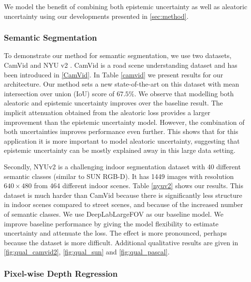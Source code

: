 We model the benefit of combining both epistemic uncertainty as well as aleatoric uncertainty using our developments presented in \cref{sec:method}. 

\subsubsection{Semantic Segmentation}

To demonstrate our method for semantic segmentation, we use two datasets, CamVid \citep{brostow2009semantic} and NYU v2 \citep{silberman2012indoor}. CamVid is a road scene understanding dataset and has been introduced in \cref{CamVid}. In Table \ref{camvid} we present results for our architecture. Our method sets a new state-of-the-art on this dataset with mean intersection over union (IoU) score of $67.5\%$. We observe that modelling both aleatoric and epistemic uncertainty improves over the baseline result.  The implicit attenuation obtained from the aleatoric loss provides a larger improvement than the epistemic uncertainty model. However, the combination of both uncertainties improves performance even further. This shows that for this application it is more important to model aleatoric uncertainty, suggesting that epistemic uncertainty can be mostly explained away in this large data setting.

Secondly, NYUv2 \citep{silberman2012indoor} is a challenging indoor segmentation dataset with 40 different semantic classes (similar to SUN RGB-D). It has 1449 images with resolution $640\times480$ from 464 different indoor scenes. Table \ref{nyuv2} shows our results. This dataset is much harder than CamVid because there is significantly less structure in indoor scenes compared to street scenes, and because of the increased number of semantic classes. We use DeepLabLargeFOV \citep{chen2016deeplab} as our baseline model. We improve baseline performance by giving the model flexibility to estimate uncertainty and attenuate the loss. The effect is more pronounced, perhaps because the dataset is more difficult. Additional qualitative results are given in \cref{fig:qual_camvid2}, \cref{fig:qual_sun} and \cref{fig:qual_pascal}.



\subsubsection{Pixel-wise Depth Regression}

